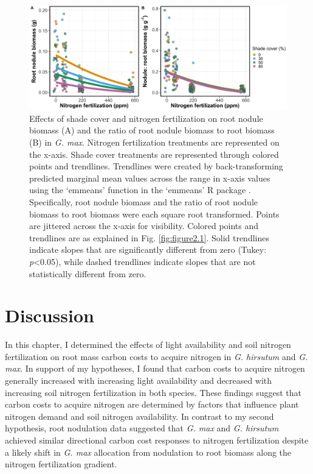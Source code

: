 \newpage
\begin{landscape}

\begin{figure}
    \centering
    \includegraphics[width = \columnwidth]{ch2_LxN_Greenhouse/figs/fig4_nodwgt.jpg}
    \caption[Effects of shade cover and nitrogen fertilization on root nodule biomass and the ratio of root nodule biomass to root biomass in \textit{G. max}.]{Effects of shade cover and nitrogen fertilization on root nodule biomass (A) and the ratio of root nodule biomass to root biomass (B) in \textit{G. max}. Nitrogen fertilization treatments are represented on the x-axis. Shade cover treatments are represented through colored points and trendlines. Trendlines were created by back-transforming predicted marginal mean values across the range in x-axis values using the `emmeans’ function in the `emmeans’ R package . Specifically, root nodule biomass and the ratio of root nodule biomass to root biomass were each square root transformed. Points are jittered across the x-axis for visibility. Colored points and trendlines are as explained in Fig. \ref{fig:figure2.1}. Solid trendlines indicate slopes that are significantly different from zero (Tukey: \textit{p}<0.05), while dashed trendlines indicate slopes that are not statistically different from zero.}
    \label{fig:figure2.4}
\end{figure}
\end{landscape}
\clearpage

\section{Discussion}
\noindent In this chapter, I determined the effects of light availability and soil nitrogen fertilization on root mass carbon costs to acquire nitrogen in \textit{G. hirsutum} and \textit{G. max}. In support of my hypotheses, I found that carbon costs to acquire nitrogen generally increased with increasing light availability and decreased with increasing soil nitrogen fertilization in both species. These findings suggest that carbon costs to acquire nitrogen are determined by factors that influence plant nitrogen demand and soil nitrogen availability. In contrast to my second hypothesis, root nodulation data suggested that \textit{G. max} and \textit{G. hirsutum} achieved similar directional carbon cost responses to nitrogen fertilization despite a likely shift in \textit{G. max} allocation from nodulation to root biomass along the nitrogen fertilization gradient.

